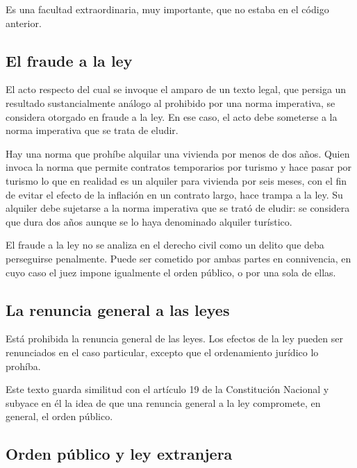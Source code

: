 \documentclass[12pt,oneside]{book}
\begin{document}
Es una facultad extraordinaria, muy importante, que no estaba en el código anterior.

\subsection{El fraude a la ley}

\begin{regla}
El acto respecto del cual se invoque el amparo de un texto legal, que persiga un resultado sustancialmente análogo al prohibido por una norma imperativa, se considera otorgado en fraude a la ley. En ese caso, el acto debe someterse a la norma imperativa que se trata de eludir.
\end{regla}

\begin{ejemplo}
Hay una norma que prohíbe alquilar una vivienda por menos de dos años. Quien invoca la norma que permite contratos temporarios por turismo y hace pasar por turismo lo que en realidad es un alquiler para vivienda por seis meses, con el fin de evitar el efecto de la inflación en un contrato largo, hace trampa a la ley. Su alquiler debe sujetarse a la norma imperativa que se trató de eludir: se considera que dura dos años aunque se lo haya denominado alquiler turístico.
\end{ejemplo}

El fraude a la ley no se analiza en el derecho civil como un delito que deba perseguirse penalmente. Puede ser cometido por ambas partes en connivencia, en cuyo caso el juez impone igualmente el orden público, o por una sola de ellas.

\subsection{La renuncia general a las leyes}

\begin{regla}
Está prohibida la renuncia general de las leyes. Los efectos de la ley pueden ser renunciados en el caso particular, excepto que el ordenamiento jurídico lo prohíba.
\end{regla}

Este texto guarda similitud con el artículo 19 de la Constitución Nacional y subyace en él la idea de que una renuncia general a la ley compromete, en general, el orden público.

\subsection{Orden público y ley extranjera}
\end{document}
